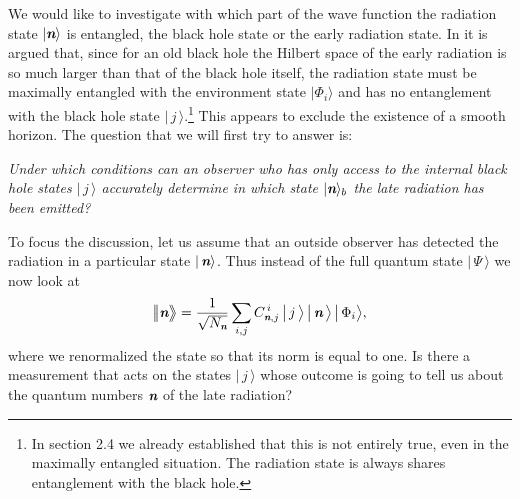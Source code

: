 \documentclass[12pt]{article}%
\def\spc{\hspace{.5pt}}
\def\be{\begin{equation}}
\def\ee{\end{equation}}
\begin{document}
 We would like to investigate with which part of the wave function the radiation state
$| { \textit{\textbf n}} \rangle$ is entangled, the black hole state or the early radiation state. In \cite{amps} it is argued that, since for an old black hole 
the Hilbert space of the early radiation is so much larger than that of the black hole itself,  the radiation state must be maximally entangled with the environment state $\bigl|\Phi_i\bigr\rangle $ and has no entanglement with the black hole state $\bigl|\,j\,\bigr\rangle $.\footnote{ In section 2.4 we already established that this is not entirely true, even in the maximally entangled situation. The radiation state is always shares entanglement with the black hole. } This appears to exclude the existence of a smooth horizon. The question that we will first try to answer is:
\medskip

\noindent 
{\it Under which conditions can an observer who has only access to the internal black hole states $\bigl|\, j\, \bigr\rangle$ accurately determine in which state $| { \textit{\textbf n}} \rangle_b$ the late radiation has been emitted?}

\smallskip

\noindent
To focus the discussion, let us assume that  an outside observer has detected the radiation  in a particular state $|\, { \textit{\textbf n}}\rangle$.  Thus instead of the full quantum 
state $\bigl|\, \Psi\,\bigr\rangle$ we now look at
\be
\label{newstatet}
\bigl|\!\nspc\spc\bigl|\nom \bigr\rangle\!\!\bigr\rangle = {1\over \sqrt{N_\nom}}\sum_{i, j} C^{\,i}_{\nom, j} \,\bigl| \,j\,\bigr \rangle \,\bigl| \,\nom\,\bigr \rangle\, \bigl| \,\Phi_i\bigr \rangle,
\ee
where we renormalized the state so that its norm is equal to one. 
Is there a measurement that acts on the states $\bigl|\,j\,\bigr\rangle $ whose outcome is going to tell us about the quantum numbers ${ \textit{\textbf n}}$ of the late radiation?
\end{document}
